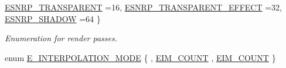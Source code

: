 \begin{DoxyCompactItemize}
\hyperlink{namespaceirr_1_1scene_a7862269bd1abc123929d4dbb8200d67fa6fad35f5334d408f1991e098815630a0}{E\+S\+N\+R\+P\+\_\+\+T\+R\+A\+N\+S\+P\+A\+R\+E\+NT} =16, 
\newline
\hyperlink{namespaceirr_1_1scene_a7862269bd1abc123929d4dbb8200d67fa0a4104464a24e4a65c0bf32ee983f498}{E\+S\+N\+R\+P\+\_\+\+T\+R\+A\+N\+S\+P\+A\+R\+E\+N\+T\+\_\+\+E\+F\+F\+E\+CT} =32, 
\hyperlink{namespaceirr_1_1scene_a7862269bd1abc123929d4dbb8200d67fa215c035bf40a0785c29fe77754af923e}{E\+S\+N\+R\+P\+\_\+\+S\+H\+A\+D\+OW} =64
 \}\begin{DoxyCompactList}\small\item\em Enumeration for render passes. \end{DoxyCompactList}
\item 
enum \hyperlink{namespaceirr_1_1scene_a26f30865cf5527e7255a8495e280314c}{E\+\_\+\+I\+N\+T\+E\+R\+P\+O\+L\+A\+T\+I\+O\+N\+\_\+\+M\+O\+DE} \{ , \hyperlink{namespaceirr_1_1scene_a26f30865cf5527e7255a8495e280314ca92bbd54f1846a9f9575e5d67371ee824}{E\+I\+M\+\_\+\+C\+O\+U\+NT}
, \hyperlink{namespaceirr_1_1scene_a26f30865cf5527e7255a8495e280314ca92bbd54f1846a9f9575e5d67371ee824}{E\+I\+M\+\_\+\+C\+O\+U\+NT}
 \}
\end{DoxyCompactItemize}
